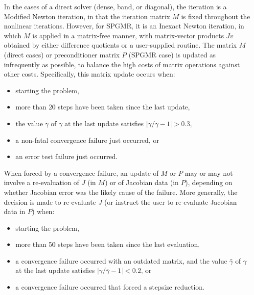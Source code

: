 In the cases of a direct solver (dense, band, or diagonal), the
iteration is a Modified Newton iteration, in that the iteration matrix
$M$ is fixed throughout the nonlinear iterations.  However, for SPGMR,
it is an Inexact Newton iteration, in which $M$ is applied in a
matrix-free manner, with matrix-vector products $Jv$ obtained by
either difference quotients or a user-supplied routine.  The matrix
$M$ (direct cases) or preconditioner matrix $P$ (SPGMR case) is
updated as infrequently as possible, to balance the high costs of
matrix operations against other costs.  Specifically, this matrix
update occurs when:
\begin{itemize}
\item starting the problem,
\item more than 20 steps have been taken since the last update,
\item the value $\bar{\gamma}$ of $\gamma$ at the last update
satisfies $|\gamma/\bar{\gamma} - 1| > 0.3$,
\item a non-fatal convergence failure just occurred, or
\item an error test failure just occurred.
\end{itemize}
When forced by a convergence failure, an update of $M$ or $P$ may or
may not involve a re-evaluation of $J$ (in $M$) or of Jacobian data
(in $P$), depending on whether Jacobian error was the likely cause of
the failure.  More generally, the decision is made to re-evaluate $J$
(or instruct the user to re-evaluate Jacobian data in $P$) when:
\begin{itemize}
\item starting the problem,
\item more than 50 steps have been taken since the last evaluation,
\item a convergence failure occurred with an outdated matrix, and
the value $\bar{\gamma}$ of $\gamma$ at the last update
satisfies $|\gamma/\bar{\gamma} - 1| < 0.2$, or
\item a convergence failure occurred that forced a stepsize reduction.
\end{itemize}

